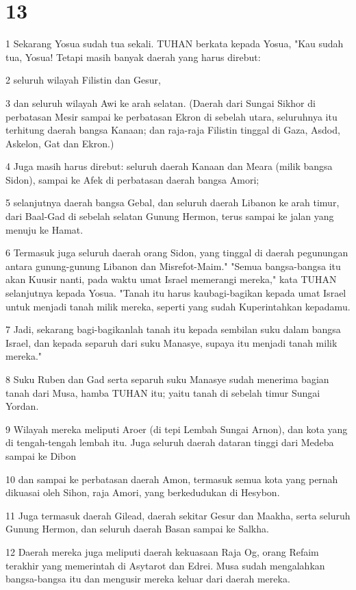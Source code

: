 \chapter{13}

\par 1 Sekarang Yosua sudah tua sekali. TUHAN berkata kepada Yosua, "Kau sudah tua, Yosua! Tetapi masih banyak daerah yang harus direbut:
\par 2 seluruh wilayah Filistin dan Gesur,
\par 3 dan seluruh wilayah Awi ke arah selatan. (Daerah dari Sungai Sikhor di perbatasan Mesir sampai ke perbatasan Ekron di sebelah utara, seluruhnya itu terhitung daerah bangsa Kanaan; dan raja-raja Filistin tinggal di Gaza, Asdod, Askelon, Gat dan Ekron.)
\par 4 Juga masih harus direbut: seluruh daerah Kanaan dan Meara (milik bangsa Sidon), sampai ke Afek di perbatasan daerah bangsa Amori;
\par 5 selanjutnya daerah bangsa Gebal, dan seluruh daerah Libanon ke arah timur, dari Baal-Gad di sebelah selatan Gunung Hermon, terus sampai ke jalan yang menuju ke Hamat.
\par 6 Termasuk juga seluruh daerah orang Sidon, yang tinggal di daerah pegunungan antara gunung-gunung Libanon dan Misrefot-Maim." "Semua bangsa-bangsa itu akan Kuusir nanti, pada waktu umat Israel memerangi mereka," kata TUHAN selanjutnya kepada Yosua. "Tanah itu harus kaubagi-bagikan kepada umat Israel untuk menjadi tanah milik mereka, seperti yang sudah Kuperintahkan kepadamu.
\par 7 Jadi, sekarang bagi-bagikanlah tanah itu kepada sembilan suku dalam bangsa Israel, dan kepada separuh dari suku Manasye, supaya itu menjadi tanah milik mereka."
\par 8 Suku Ruben dan Gad serta separuh suku Manasye sudah menerima bagian tanah dari Musa, hamba TUHAN itu; yaitu tanah di sebelah timur Sungai Yordan.
\par 9 Wilayah mereka meliputi Aroer (di tepi Lembah Sungai Arnon), dan kota yang di tengah-tengah lembah itu. Juga seluruh daerah dataran tinggi dari Medeba sampai ke Dibon
\par 10 dan sampai ke perbatasan daerah Amon, termasuk semua kota yang pernah dikuasai oleh Sihon, raja Amori, yang berkedudukan di Hesybon.
\par 11 Juga termasuk daerah Gilead, daerah sekitar Gesur dan Maakha, serta seluruh Gunung Hermon, dan seluruh daerah Basan sampai ke Salkha.
\par 12 Daerah mereka juga meliputi daerah kekuasaan Raja Og, orang Refaim terakhir yang memerintah di Asytarot dan Edrei. Musa sudah mengalahkan bangsa-bangsa itu dan mengusir mereka keluar dari daerah mereka.
